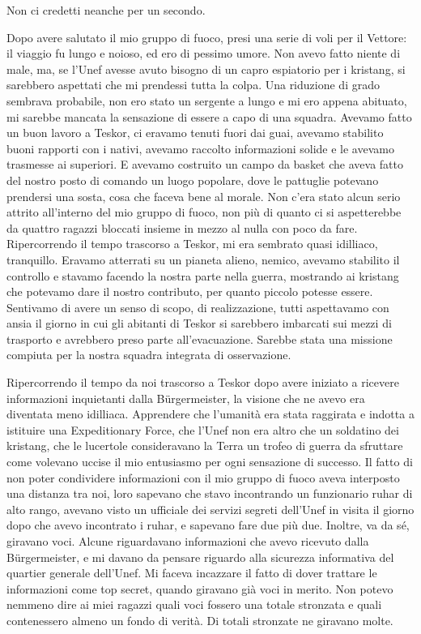 Non ci credetti neanche per un secondo.

\hfill\break

Dopo avere salutato il mio gruppo di fuoco, presi una serie di voli per
il Vettore: il viaggio fu lungo e noioso, ed ero di pessimo umore. Non
avevo fatto niente di male, ma, se l'Unef avesse avuto bisogno di un
capro espiatorio per i kristang, si sarebbero aspettati che mi prendessi
tutta la colpa. Una riduzione di grado sembrava probabile, non ero stato
un sergente a lungo e mi ero appena abituato, mi sarebbe mancata la
sensazione di essere a capo di una squadra. Avevamo fatto un buon lavoro
a Teskor, ci eravamo tenuti fuori dai guai, avevamo stabilito buoni
rapporti con i nativi, avevamo raccolto informazioni solide e le avevamo
trasmesse ai superiori. E avevamo costruito un campo da basket che aveva
fatto del nostro posto di comando un luogo popolare, dove le pattuglie
potevano prendersi una sosta, cosa che faceva bene al morale. Non c'era
stato alcun serio attrito all'interno del mio gruppo di fuoco, non più
di quanto ci si aspetterebbe da quattro ragazzi bloccati insieme in
mezzo al nulla con poco da fare. Ripercorrendo il tempo trascorso a
Teskor, mi era sembrato quasi idilliaco, tranquillo. Eravamo atterrati
su un pianeta alieno, nemico, avevamo stabilito il controllo e stavamo
facendo la nostra parte nella guerra, mostrando ai kristang che potevamo
dare il nostro contributo, per quanto piccolo potesse essere. Sentivamo
di avere un senso di scopo, di realizzazione, tutti aspettavamo con
ansia il giorno in cui gli abitanti di Teskor si sarebbero imbarcati sui
mezzi di trasporto e avrebbero preso parte all'evacuazione. Sarebbe
stata una missione compiuta per la nostra squadra integrata di
osservazione.

Ripercorrendo il tempo da noi trascorso a Teskor dopo avere iniziato a
ricevere informazioni inquietanti dalla Bürgermeister, la visione che ne
avevo era diventata meno idilliaca. Apprendere che l'umanità era stata
raggirata e indotta a istituire una Expeditionary Force, che l'Unef non
era altro che un soldatino dei kristang, che le lucertole consideravano
la Terra un trofeo di guerra da sfruttare come volevano uccise il mio
entusiasmo per ogni sensazione di successo. Il fatto di non poter
condividere informazioni con il mio gruppo di fuoco aveva interposto una
distanza tra noi, loro sapevano che stavo incontrando un funzionario
ruhar di alto rango, avevano visto un ufficiale dei servizi segreti
dell'Unef in visita il giorno dopo che avevo incontrato i ruhar, e
sapevano fare due più due. Inoltre, va da sé, giravano voci. Alcune
riguardavano informazioni che avevo ricevuto dalla Bürgermeister, e mi
davano da pensare riguardo alla sicurezza informativa del quartier
generale dell'Unef. Mi faceva incazzare il fatto di dover trattare le
informazioni come top secret, quando giravano già voci in merito. Non
potevo nemmeno dire ai miei ragazzi quali voci fossero una totale
stronzata e quali contenessero almeno un fondo di verità. Di totali
stronzate ne giravano molte.

